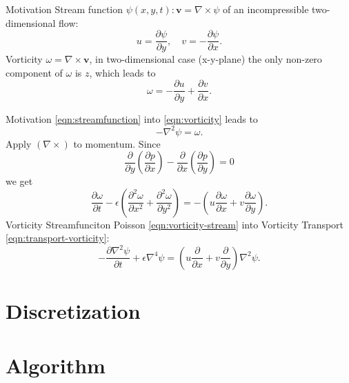 \documentclass{beamer}
\begin{document}
  \begin{frame}{Motivation}
	Stream function $\psi(x,y,t):\boldsymbol{v}=\nabla \times \psi$ of an incompressible two-dimensional flow:
	\begin{equation}
	\label{eqn:streamfunction}
		u = \frac{\partial \psi}{\partial y},\quad v=-\frac{\partial \psi}{\partial x}.
	\end{equation}
	Vorticity $\omega = \nabla \times \boldsymbol{v}$, in two-dimensional case (x-y-plane) the only non-zero component of $\omega$ is $z$, which leads to
	\begin{equation}
	\label{eqn:vorticity}
		\omega=- \frac{\partial u}{\partial y}+\frac{\partial v}{\partial x}.
	\end{equation}
  \end{frame}
  
  \begin{frame}{Motivation}
  \eqref{eqn:streamfunction} into \eqref{eqn:vorticity} leads to
	\begin{equation}
			\label{eqn:vorticity-stream}
			-\nabla ^2 \psi = \omega.
		\end{equation}
  Apply $(\nabla \times)$ to momentum. Since
	\begin{equation}
	\frac{\partial}{\partial y}\left(\frac{\partial p}{\partial x}\right) - 
	\frac{\partial}{\partial x}\left(\frac{\partial p}{\partial y}\right)=0
	\end{equation}
	we get
  \begin{equation}
			\label{eqn:transport-vorticity}
				\frac{\partial\omega}{\partial t} -\epsilon \left(\frac{\partial ^2 \omega}{\partial x^2} 
				+ \frac{\partial^2 \omega}{\partial y^2} \right)
				=-\left( u \frac{\partial\omega}{\partial x} 
				+ v\frac{\partial\omega}{\partial y}\right).
			\end{equation}
	Vorticity Streamfunciton Poisson \eqref{eqn:vorticity-stream} into Vorticity Transport \eqref{eqn:transport-vorticity}:
	\begin{equation}
	\label{eqn:biharmonic-streamfunction}
		\boxed{
		-\frac{\partial\nabla ^2 \psi}{\partial t} 
		+\epsilon\nabla ^4 \psi=\left( u \frac{\partial}{\partial x} 
				+ v\frac{\partial}{\partial y}\right)\nabla^2\psi.
		}
	\end{equation}
  \end{frame}

  
  \section{Discretization}
  
  \section{Algorithm}
\end{document}
